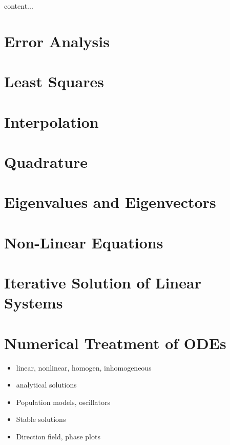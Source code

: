 \begin{definition}
	content...
\end{definition}

\pagebreak

\section{Error Analysis}


\section{Least Squares}


\section{Interpolation}


\section{Quadrature}

\section{Eigenvalues and Eigenvectors}


\section{Non-Linear Equations}


\section{Iterative Solution of Linear Systems}

\section{Numerical Treatment of ODEs}
\begin{itemize}
	\item linear, nonlinear, homogen, inhomogeneous
	\item analytical solutions
	\item Population models, oscillators
	\item Stable solutions
	\item Direction field, phase plots
\end{itemize}


